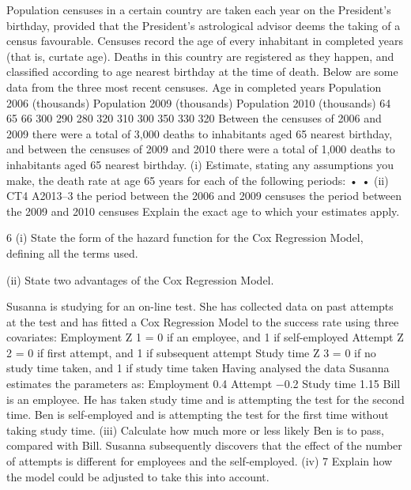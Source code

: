 Population censuses in a certain country are taken each year on the President’s
birthday, provided that the President’s astrological advisor deems the taking of a
census favourable. Censuses record the age of every inhabitant in completed years
(that is, curtate age). Deaths in this country are registered as they happen, and
classified according to age nearest birthday at the time of death.
Below are some data from the three most recent censuses.
Age in
completed
years Population
2006
(thousands) Population
2009
(thousands) Population
2010
(thousands)
64
65
66 300
290
280 320
310
300 350
330
320
Between the censuses of 2006 and 2009 there were a total of 3,000 deaths to
inhabitants aged 65 nearest birthday, and between the censuses of 2009 and 2010
there were a total of 1,000 deaths to inhabitants aged 65 nearest birthday.
(i)
Estimate, stating any assumptions you make, the death rate at age 65 years for
each of the following periods:
•
•
(ii)
CT4 A2013–3
the period between the 2006 and 2009 censuses
the period between the 2009 and 2010 censuses
Explain the exact age to which your estimates apply.


6
(i) State the form of the hazard function for the Cox Regression Model, defining
all the terms used.

(ii) State two advantages of the Cox Regression Model.

Susanna is studying for an on-line test. She has collected data on past attempts at the
test and has fitted a Cox Regression Model to the success rate using three covariates:
Employment Z 1 = 0 if an employee, and 1 if self-employed
Attempt
Z 2 = 0 if first attempt, and 1 if subsequent attempt
Study time
Z 3 = 0 if no study time taken, and 1 if study time taken
Having analysed the data Susanna estimates the parameters as:
Employment 0.4
Attempt
−0.2
Study time
1.15
Bill is an employee. He has taken study time and is attempting the test for the second time. Ben is self-employed and is attempting the test for the first time without taking
study time.
(iii)
Calculate how much more or less likely Ben is to pass, compared with Bill. 
Susanna subsequently discovers that the effect of the number of attempts is different
for employees and the self-employed.
(iv)
7
Explain how the model could be adjusted to take this into account.


